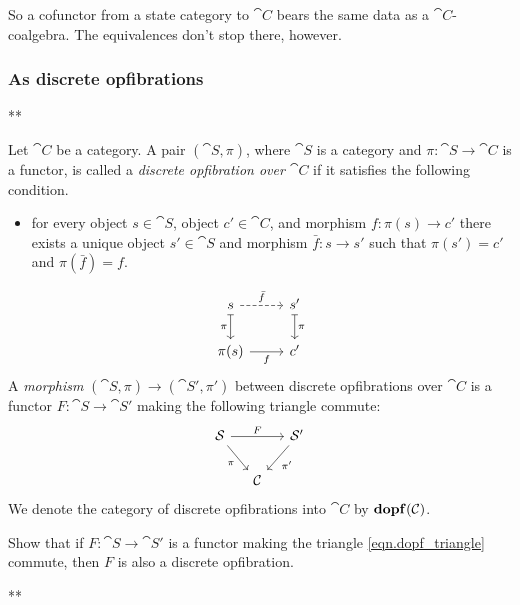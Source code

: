 \documentclass[Book-Poly]{subfiles}
\begin{document}
So a cofunctor from a state category to $\cat{C}$ bears the same data as a $\cat{C}$-coalgebra.
The equivalences don't stop there, however.

\subsubsection{As discrete opfibrations}

**

\begin{definition}\label{def.dopf}
Let $\cat{C}$ be a category. A pair $(\cat{S},\pi)$, where $\cat{S}$ is a category and $\pi\colon\cat{S}\to\cat{C}$ is a functor, is called a \emph{discrete opfibration over $\cat{C}$} if it satisfies the following condition.
\begin{itemize}
	\item for every object $s\in\cat{S}$, object $c'\in\cat{C}$, and morphism $f\colon \pi(s)\to c'$ there exists a unique object $s'\in\cat{S}$ and morphism $\bar{f}\colon s\to s'$ such that $\pi(s')=c'$ and $\pi(\bar{f})=f$.
\end{itemize}
\[
\begin{tikzcd}
  s\ar[r, dashed, "\bar{f}"]\ar[d, |->, "\pi"']&
  s'\ar[d, |->, "\pi"]\\
  \pi(s)\ar[r, "f"']&
  c'
\end{tikzcd}
\]
A \emph{morphism} $(\cat{S},\pi)\to(\cat{S}',\pi')$ between discrete opfibrations over $\cat{C}$ is a functor $F\colon\cat{S}\to\cat{S}'$ making the following triangle commute:
\begin{equation}\label{eqn.dopf_triangle}
\begin{tikzcd}[column sep=small]
	\cat{S}\ar[dr, "\pi"']\ar[rr, "F"]&&
	\cat{S}'\ar[dl, "\pi'"]\\&
	\cat{C}
\end{tikzcd}
\end{equation}
We denote the category of discrete opfibrations into $\cat{C}$ by $\mathbf{dopf}(\mathcal{C})$.
\end{definition}

\begin{exercise}
Show that if $F\colon \cat{S}\to\cat{S}'$ is a functor making the triangle \eqref{eqn.dopf_triangle} commute, then $F$ is also a discrete opfibration.
\begin{solution}
**
\end{solution}
\end{exercise}
\end{document}
